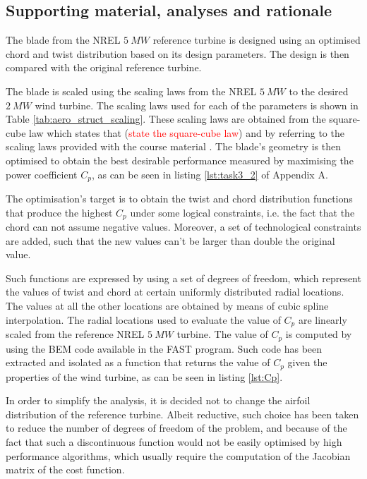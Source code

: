 \subsection{Supporting material, analyses and rationale}
The blade from the NREL $5\ MW$ reference turbine \cite{5MW} is designed using an optimised chord and twist distribution based on its design parameters. The design is then compared with the original reference turbine.

The blade is scaled using the scaling laws from the NREL $5\ MW$ to the desired $2\ MW$ wind turbine. The scaling laws used for each of the parameters is shown in Table \ref{tab:aero_struct_scaling}. These scaling laws are obtained from the square-cube law which states that (\textcolor{red}{state the square-cube law}) and by referring to the scaling laws provided with the course material \cite{scaling_laws}. The blade's geometry is then optimised to obtain the best desirable performance measured by maximising the power coefficient $C_p$, as can be seen in listing \ref{lst:task3_2} of Appendix A.

The optimisation's target is to obtain the twist and chord distribution functions that produce the highest $C_p$ under some logical constraints, i.e. the fact that the chord can not assume negative values. Moreover, a set of technological constraints are added, such that the new values can't be larger than double the original value. 

Such functions are expressed by using a set of degrees of freedom, which represent the values of twist and chord at certain uniformly distributed radial locations. The values at all the other locations are obtained by means of cubic spline interpolation. The radial locations used to evaluate the value of $C_p$ are linearly scaled from the reference NREL $5\ MW$ turbine. The value of $C_p$ is computed by using the BEM code available in the FAST program. Such code has been extracted and isolated as a function that returns the value of $C_p$ given the properties of the wind turbine, as can be seen in listing \ref{lst:Cp}.

In order to simplify the analysis, it is decided not to change the airfoil distribution of the reference turbine. Albeit reductive, such choice has been taken to reduce the number of degrees of freedom of the problem, and because of the fact that such a discontinuous function would not be easily optimised by high performance algorithms, which usually require the computation of the Jacobian matrix of the cost function.

